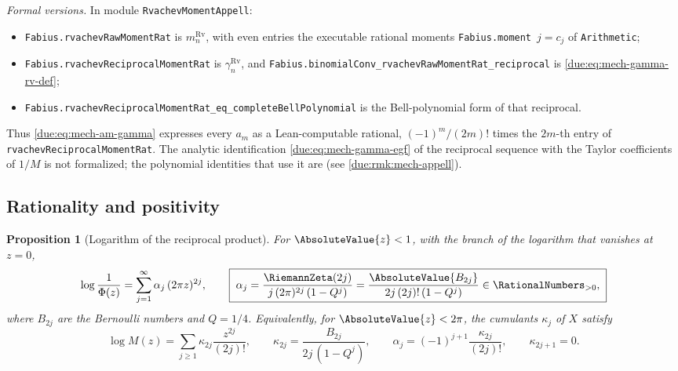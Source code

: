 \documentclass[11pt,oneside]{article}
\theoremstyle{plain}
\newtheorem{proposition}[theorem]{Proposition}
\theoremstyle{definition}
\theoremstyle{remark}
\newcommand{\PhiUp}{\Phi}                                   %
\newcommand{\Qq}{Q}                                         %
\newcommand{\am}[1]{a_{#1}}                                 %
\begin{document}
\emph{Formal versions.}  In module \texttt{RvachevMomentAppell}:
\begin{sloppypar}
\begin{itemize}
\item \texttt{Fabius.\allowbreak rvachevRawMomentRat} is \(m^{\mathrm{Rv}}_n\), with even
entries the executable rational moments \texttt{Fabius.moment}~\(j=c_j\) of
\texttt{Arithmetic};
\item \texttt{Fabius.\allowbreak rvachevReciprocalMomentRat} is \(\gamma^{\mathrm{Rv}}_n\),
and \texttt{Fabius.\allowbreak binomialConv\_\allowbreak rvachevRawMomentRat\_\allowbreak reciprocal} is
\cref{due:eq:mech-gamma-rv-def};
\item \texttt{Fabius.\allowbreak rvachevReciprocalMomentRat\_\allowbreak eq\_\allowbreak completeBellPolynomial}
is the Bell-polynomial form of that reciprocal.
\end{itemize}
\end{sloppypar}
Thus \cref{due:eq:mech-am-gamma} expresses every \(\am{m}\) as a
Lean-computable rational, \((-1)^m/(2m)!\) times the \(2m\)-th entry of
\texttt{rvachevReciprocalMomentRat}.  The analytic identification
\cref{due:eq:mech-gamma-egf} of the reciprocal sequence with the Taylor
coefficients of \(1/M\) is not formalized; the polynomial identities that use
it are (see \cref{due:rmk:mech-appell}).

\subsection{Rationality and positivity}

\begin{proposition}[Logarithm of the reciprocal product]
\label{due:prop:mech-log}
For \(\AbsoluteValue{z}<1\), with the branch of the logarithm that vanishes
at \(z=0\),
\begin{equation}
 \log\frac1{\PhiUp(z)}=\sum_{j=1}^{\infty}\alpha_j\,(2\pi z)^{2j},
 \qquad
 \boxed{\;
 \alpha_j=\frac{\RiemannZeta(2j)}{j\,(2\pi)^{2j}\,(1-\Qq^{j})}
 =\frac{\AbsoluteValue{B_{2j}}}{2j\,(2j)!\,(1-\Qq^{j})}
 \in\RationalNumbers_{>0},\;}
 \label{due:eq:mech-alpha}
\end{equation}
where \(B_{2j}\) are the Bernoulli numbers and \(\Qq=1/4\).  Equivalently,
for \(\AbsoluteValue{z}<2\pi\), the cumulants \(\kappa_j\) of \(X\) satisfy
\begin{equation}
 \log M(z)=\sum_{j\ge1}\kappa_{2j}\frac{z^{2j}}{(2j)!},
 \qquad
 \kappa_{2j}=\frac{B_{2j}}{2j\,(1-\Qq^{j})},
 \qquad
 \alpha_j=(-1)^{j+1}\frac{\kappa_{2j}}{(2j)!},
 \qquad
 \kappa_{2j+1}=0 .
 \label{due:eq:mech-kappa}
\end{equation}
\end{proposition}
\end{document}
